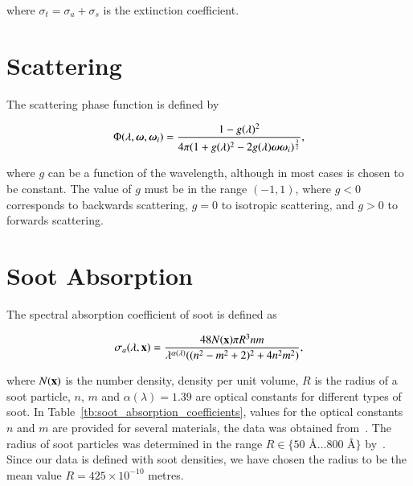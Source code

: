 where $\sigma_t = \sigma_a + \sigma_s$ is the extinction coefficient.

\section{Scattering}
\label{sec:scattering}

The scattering phase function is defined by

\begin{equation}
\Phi (\lambda, \boldsymbol{\omega}, \boldsymbol{\omega}_i) = \frac{1 - g(\lambda)^2}{4 \pi(1 + g(\lambda)^2 - 2 g(\lambda) \boldsymbol{\omega} \boldsymbol{\omega}_i)^{\frac{3}{2}}},
\end{equation}

where $g$ can be a function of the wavelength, although in most cases is chosen to be constant.
The value of $g$ must be in the range $(-1, 1)$, where $g < 0$ corresponds to backwards scattering, $g = 0$ to isotropic scattering, and $g > 0$ to forwards scattering.

\section{Soot Absorption}
\label{sec:soot_absorption}

The spectral absorption coefficient of soot is defined as

\begin{equation}
\sigma_a(\lambda, \mathbf{x}) = \frac{48 N(\mathbf{x}) \pi R^3 n m}{\lambda^{\alpha(\lambda)} ((n^2 - m^2 +2)^2 + 4 n^2 m^2)},
\end{equation}

where $N(\mathbf{x})$ is the number density, density per unit volume, $R$ is the radius of a soot particle, $n$, $m$ and $\alpha(\lambda) = 1.39$ are optical constants for different types of soot.
In Table~\ref{tb:soot_absorption_coefficients}, values for the optical constants $n$ and $m$ are provided for several materials, the data was obtained from~\cite{Dalzell:1969}.
The radius of soot particles was determined in the range $R \in \lbrace 50\mbox{~\AA} \ldots 800\mbox{~\AA} \rbrace $ by~\cite{Dalzell:1969}.
Since our data is defined with soot densities, we have chosen the radius to be the mean value $R = 425 \times 10^{-10}$ metres.

